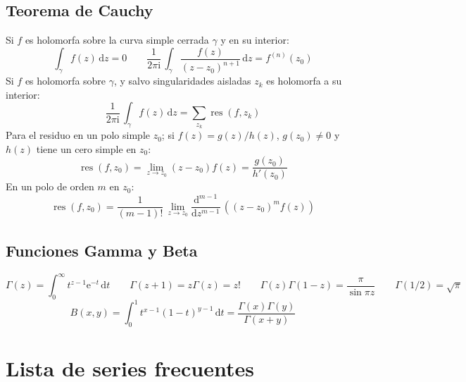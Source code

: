 \documentclass[fleqn, spanish]{article}
\DeclareMathOperator{\res}{res}
\begin{document}
\subsection*{Teorema de Cauchy}
\label{sec:Cauchy}

  Si \(f\) es holomorfa sobre la curva simple cerrada \(\gamma\)
  y en su interior:
  \begin{equation*}
    \int_\gamma f(z) \, \mathrm{d} z
      = 0
    \qquad
    \frac{1}{2 \pi \mathrm{i}} \,
      \int_\gamma \frac{f(z)}{(z - z_0)^{n + 1}} \, \mathrm{d} z
      = f^{(n)} (z_0)
  \end{equation*}
  Si \(f\) es holomorfa sobre \(\gamma\),
  y salvo singularidades aisladas \(z_k\) es holomorfa a su interior:
  \begin{equation*}
    \frac{1}{2 \pi \mathrm{i}} \, \int_\gamma f(z) \, \mathrm{d} z
      = \sum_{z_k} \res(f, z_k)
  \end{equation*}
  Para el residuo en un polo simple \(z_0\);
  si \(f(z) = g(z) / h(z)\),
  \(g(z_0) \ne 0\) y \(h(z)\) tiene un cero simple en \(z_0\):
  \begin{equation*}
    \res(f, z_0)
      = \lim_{z \rightarrow z_0} (z - z_0) f(z)
      = \frac{g(z_0)}{h'(z_0)}
  \end{equation*}
  En un polo de orden \(m\) en \(z_0\):
  \begin{equation*}
    \res(f, z_0)
      = \frac{1}{(m - 1)!} \,
	  \lim_{z \rightarrow z_0}
	    \frac{\mathrm{d}^{m - 1}}{\mathrm{d} z^{m - 1}} \,
	      ((z - z_0)^m f(z))
  \end{equation*}

\subsection*{Funciones Gamma y Beta}
\label{sec:funciones-gamma-beta}

  \begin{equation*}
    \Gamma(z)
      = \int_0^\infty t^{z - 1} \mathrm{e}^{-t} \, \mathrm{d} t
    \qquad
    \Gamma(z + 1)
      = z \Gamma(z)
      = z!
    \qquad
    \Gamma(z) \Gamma(1 - z)
      = \frac{\pi}{\sin \pi z}
    \qquad
    \Gamma(1 / 2)
      = \sqrt{\pi}
  \end{equation*}
  \begin{equation*}
    B(x, y)
      = \int_0^1 t^{x - 1} (1 - t)^{y - 1} \, \mathrm{d} t
      = \frac{\Gamma(x) \Gamma(y)}{\Gamma(x + y)}
  \end{equation*}

\section*{Lista de series frecuentes}
\label{sec:series-frecuentes}
\end{document}
